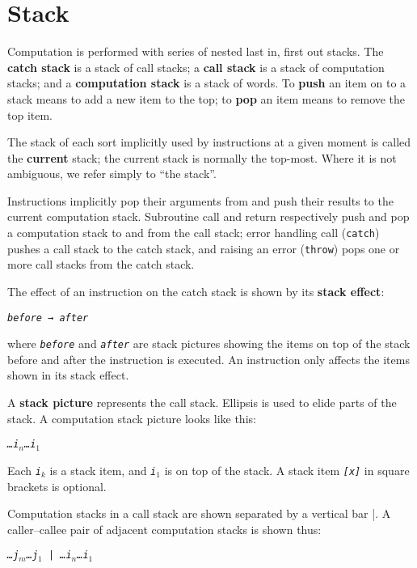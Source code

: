 \documentclass[a4paper]{article}
\newcommand{\spic}[1]{\texttt{\slshape{#1\/}}}
\begin{document}
\section{Stack}

Computation is performed with series of nested last in, first out stacks. The {\bf catch stack} is a stack of call stacks; a {\bf call stack} is a stack of computation stacks; and a {\bf computation stack} is a stack of words. To {\bf push} an item on to a stack means to add a new item to the top; to {\bf pop} an item means to remove the top item.

The stack of each sort implicitly used by instructions at a given moment is called the {\bf current} stack; the current stack is normally the top-most. Where it is not ambiguous, we refer simply to “the stack”.

Instructions implicitly pop their arguments from and push their results to the current computation stack. Subroutine call and return respectively push and pop a computation stack to and from the call stack; error handling call ({\tt catch}) pushes a call stack to the catch stack, and raising an error ({\tt throw}) pops one or more call stacks from the catch stack.

The effect of an instruction on the catch stack is shown by its {\bf stack effect}:

\begin{center}
  {\tt \spic{before → after}}
\end{center}

\noindent where \spic{before} and \spic{after} are stack pictures showing the items on top of the stack before and after the instruction is executed. An instruction only affects the items shown in its stack effect.

A {\bf stack picture} represents the call stack. Ellipsis is used to elide parts of the stack. A computation stack picture looks like this:

\begin{center}
\spic{…i$_n$\dots i$_1$}
\end{center}

\noindent Each \spic{i$_k$} is a stack item, and \spic{i$_1$} is on top of the stack. A stack item \spic{[x]} in square brackets is optional.

Computation stacks in a call stack are shown separated by a vertical bar {\rm |}. A caller–callee pair of adjacent computation stacks is shown thus:

\begin{center}
\spic{…j$_m$\dots j$_1$ {\rm |} …i$_n$\dots i$_1$}
\end{center}
\end{document}
